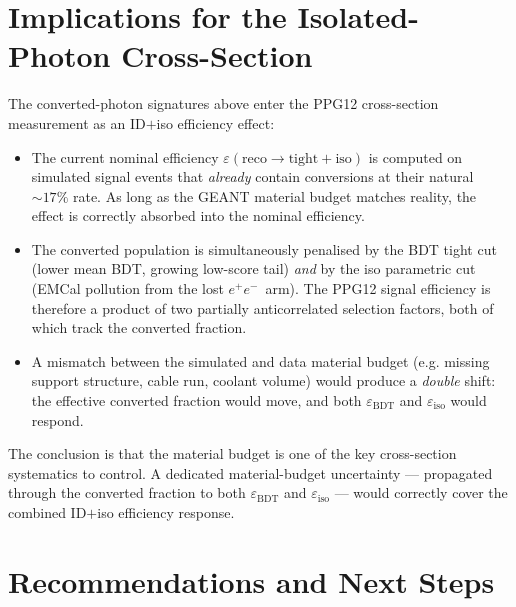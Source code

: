\documentclass[11pt,a4paper]{article}
\newcommand{\epem}{\ensuremath{e^{+}e^{-}}}
\begin{document}
\section{Implications for the Isolated-Photon Cross-Section}
\label{sec:cross_section}

The converted-photon signatures above enter the PPG12 cross-section
measurement as an ID$+$iso efficiency effect:

\begin{itemize}
  \item The current nominal efficiency $\varepsilon(\mathrm{reco}\to
  \mathrm{tight+iso})$ is computed on simulated signal events that
  \emph{already} contain conversions at their natural $\sim 17\%$ rate. As
  long as the GEANT material budget matches reality, the effect is
  correctly absorbed into the nominal efficiency.
  \item The converted population is simultaneously penalised by the BDT
  tight cut (lower mean BDT, growing low-score tail) \emph{and} by the iso
  parametric cut (EMCal pollution from the lost \epem\ arm). The PPG12
  signal efficiency is therefore a product of two partially anticorrelated
  selection factors, both of which track the converted fraction.
  \item A mismatch between the simulated and data material budget (e.g.
  missing support structure, cable run, coolant volume) would produce a
  \emph{double} shift: the effective converted fraction would move, and
  both $\varepsilon_{\mathrm{BDT}}$ and $\varepsilon_{\mathrm{iso}}$ would
  respond.
\end{itemize}

\noindent The conclusion is that the material budget is one of the key
cross-section systematics to control.  A dedicated material-budget
uncertainty --- propagated through the converted fraction to both
$\varepsilon_{\mathrm{BDT}}$ and $\varepsilon_{\mathrm{iso}}$ --- would
correctly cover the combined ID$+$iso efficiency response.


\section{Recommendations and Next Steps}
\label{sec:next_steps}
\end{document}
